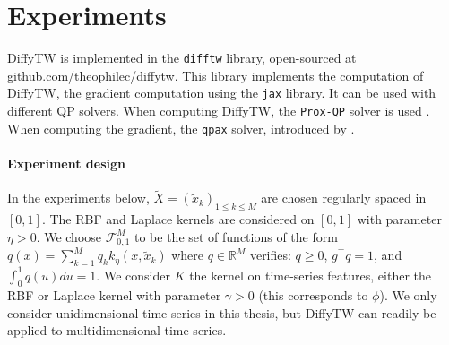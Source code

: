 \section{Experiments}\label{sec:diffytw-experiments}
DiffyTW is implemented in the \texttt{difftw} library, open-sourced at \url{github.com/theophilec/diffytw}. This library implements the computation of DiffyTW, the gradient computation using the \texttt{jax} library. It can be used with different QP solvers. When computing DiffyTW, the \texttt{Prox-QP} solver is used \cite{fabian}. When computing the gradient, the \texttt{qpax} solver, introduced by \citet{qpax}.




\paragraph{Experiment design}
In the experiments below, $\tilde X = (\tilde x_k)_{1\leq k \leq M}$ are chosen regularly spaced in $[0,1]$. The RBF and Laplace kernels are considered on $[0,1]$ with parameter $\eta >0$. We choose $\mathcal F_{0,1}^M$ to be the set of functions of the form $q(x) = \sum_{k=1}^Mq_k k_\eta(x, \tilde x_k)$ where $q\in\mathbb R^M$ verifies: $q \geq 0$, $g^\top q =1$, and $\int_0^1 q(u)du =1$.
We consider $K$ the kernel on time-series features, either the RBF or Laplace kernel with parameter $\gamma> 0$ (this corresponds to $\phi$). We only consider unidimensional time series in this thesis, but DiffyTW can readily be applied to multidimensional time series.

